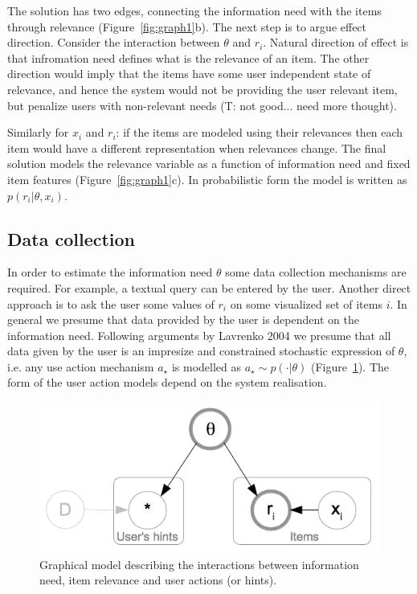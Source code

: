 \documentclass[10pt]{article}
\begin{document}
The solution has two edges, connecting the information need with the items through
relevance (Figure~\ref{fig:graph1}b). The next step is to argue effect direction. Consider the interaction between $\theta$ and $r_i$. Natural direction of effect is that infromation need defines what is the relevance of an item. The other direction would imply that the items have some user independent state of relevance, and hence the system would not be providing the user relevant item, but penalize users with non-relevant needs (T: not good... need more thought).

Similarly for $x_i$ and $r_i$: if the items are modeled using their relevances then each item would have a different representation when relevances change. The final solution models the relevance variable as a function of information need and fixed item features (Figure~\ref{fig:graph1}c). In probabilistic form the model is written as $p(r_i|\theta, x_i)$. 
\subsection{Data collection}
In order to estimate the information need $\theta$ some data collection mechanisms are required. For example, a textual query can be entered by the user. Another direct approach is to ask the user some values of $r_i$ on some visualized set of items $i$. In general we presume that data provided by the user is dependent on the information need. Following arguments by   Lavrenko 2004 we presume that all data given by the user is an impresize and constrained stochastic expression of $\theta$, i.e. any use action mechanism $a_\star$ is modelled as $a_\star \sim p(\cdot| \theta)$ (Figure~\ref{fig:graph2}). The form of the user action models depend on the system realisation.

\begin{figure}[!h]
\centering
\includegraphics[scale=.35]{figures/user-model.png}
\caption{Graphical model describing the interactions between information need, item relevance and user actions (or hints).}
\label{fig:graph2}
\end{figure}
\end{document}
